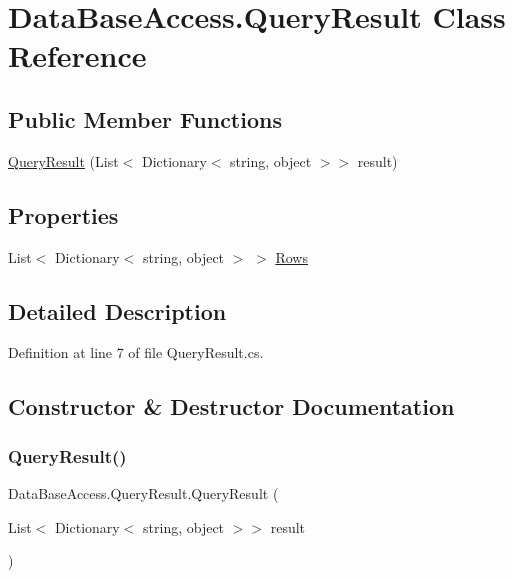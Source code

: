 \hypertarget{classDataBaseAccess_1_1QueryResult}{}\section{Data\+Base\+Access.\+Query\+Result Class Reference}
\label{classDataBaseAccess_1_1QueryResult}
\subsection*{Public Member Functions}
\begin{DoxyCompactItemize}
\item 
\mbox{\hyperlink{classDataBaseAccess_1_1QueryResult_a4772669172c5a8171e6ad2b7608959bc}{Query\+Result}} (List$<$ Dictionary$<$ string, object $>$$>$ result)
\end{DoxyCompactItemize}
\subsection*{Properties}
\begin{DoxyCompactItemize}
\item 
List$<$ Dictionary$<$ string, object $>$ $>$ \mbox{\hyperlink{classDataBaseAccess_1_1QueryResult_ad6d699c5577f56da79740f1790433565}{Rows}}
\end{DoxyCompactItemize}


\subsection{Detailed Description}


Definition at line 7 of file Query\+Result.\+cs.



\subsection{Constructor \& Destructor Documentation}
\mbox{\label{classDataBaseAccess_1_1QueryResult_a4772669172c5a8171e6ad2b7608959bc}} 
\subsubsection{\texorpdfstring{QueryResult()}{QueryResult()}}
{\footnotesize\ttfamily Data\+Base\+Access.\+Query\+Result.\+Query\+Result (\begin{DoxyParamCaption}\item[{List$<$ Dictionary$<$ string, object $>$$>$}]{result }\end{DoxyParamCaption})}



